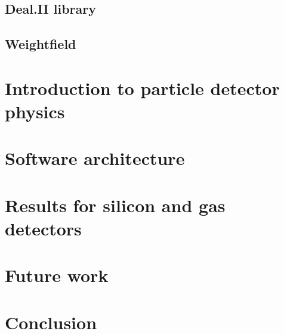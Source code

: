\documentclass[11pt]{article}
\begin{document}
	\subsection{Deal.II library}

	\subsection{Weightfield}

\section{Introduction to particle detector physics}

\section{Software architecture}

\section{Results for silicon and gas detectors}

\section{Future work}

\section{Conclusion}
\end{document}
